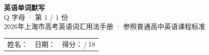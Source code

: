\documentclass[10pt,a4paper]{article}
\begin{document}
\pagestyle{plain}

\begin{center}
{\LARGE\bfseries 英语单词默写}\\[0.22em]
{\large Q 字母 · 第 1 / 1 份}\\[0.18em]
{\small 2026年上海市高考英语词汇用法手册 · 参照普通高中英语课程标准}
\end{center}

\vspace{0.25em}
\noindent\begin{tabular}{@{}p{}@{}p{}@{}p{}@{}}
姓名：\underline{\hspace{2.0cm}} & 日期：\underline{\hspace{2.0cm}} & 得分：\underline{\hspace{1.3cm}}\,/\,18 \\
\end{tabular}

\vspace{0.3em}

\vspace{0.08em}
\end{document}
